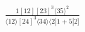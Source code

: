 \documentclass[varwidth, border=5pt]{standalone}
\begin{document}
\begin{my}
$\begin{gathered}
\scriptscriptstyle\frac{1[12][23]^3⟨35⟩^2}{⟨12⟩[24]^3⟨34⟩⟨2|1+5|2]}
\end{gathered}$
\end{my}
\end{document}
